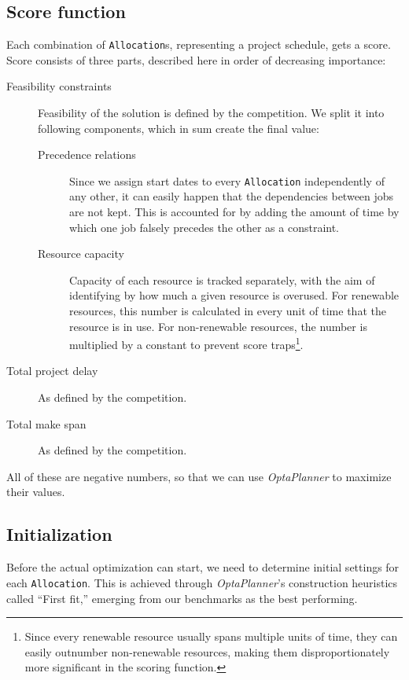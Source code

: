 \documentclass[10pt,a4paper]{article}
\begin{document}
\subsection{Score function}

Each combination of \texttt{Allocation}s, representing a project schedule, gets a score. Score consists of three parts, described here in order of decreasing importance:

\begin{description}
\item[Feasibility constraints] Feasibility of the solution is defined by the competition. We split it into following components, which in sum create the final value:

\begin{description}
\item[Precedence relations] Since we assign start dates to every \texttt{Allocation} independently of any other, it can easily happen that the dependencies between jobs are not kept. This is accounted for by adding the amount of time by which one job falsely precedes the other as a constraint.
\item[Resource capacity] Capacity of each resource is tracked separately, with the aim of identifying by how much a given resource is overused. For renewable resources, this number is calculated in every unit of time that the resource is in use. For non-renewable resources, the number is multiplied by a constant to prevent score traps\footnote{Since every renewable resource usually spans multiple units of time, they can easily outnumber non-renewable resources, making them disproportionately more significant in the scoring function.}.
\end{description}

\item[Total project delay] As defined by the competition.
\item[Total make span] As defined by the competition.
\end{description}

All of these are negative numbers, so that we can use \textit{OptaPlanner} to maximize their values.

\subsection{Initialization}

Before the actual optimization can start, we need to determine initial settings for each \texttt{Allocation}. This is achieved through \textit{OptaPlanner}'s construction heuristics called ``First fit,'' emerging from our benchmarks as the best performing.
\end{document}
